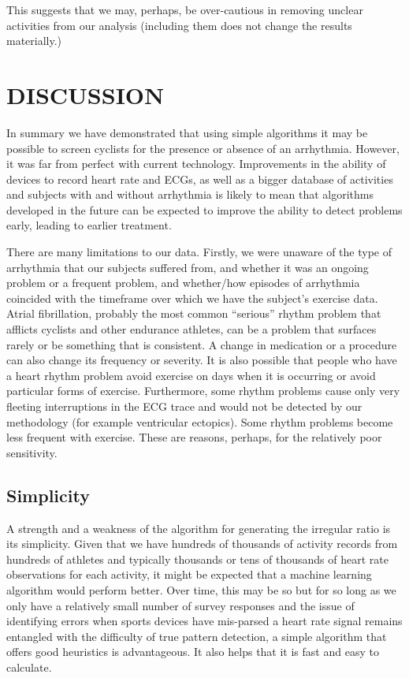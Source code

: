 \documentclass[
  letterpaper,
  DIV=11,
  numbers=noendperiod]{scrartcl}
\begin{document}
This suggests that we may, perhaps, be over-cautious in removing unclear
activities from our analysis (including them does not change the results
materially.)

\section{DISCUSSION}\label{discussion-1}

In summary we have demonstrated that using simple algorithms it may be
possible to screen cyclists for the presence or absence of an
arrhythmia. However, it was far from perfect with current technology.
Improvements in the ability of devices to record heart rate and ECGs, as
well as a bigger database of activities and subjects with and without
arrhythmia is likely to mean that algorithms developed in the future can
be expected to improve the ability to detect problems early, leading to
earlier treatment.

There are many limitations to our data. Firstly, we were unaware of the
type of arrhythmia that our subjects suffered from, and whether it was
an ongoing problem or a frequent problem, and whether/how episodes of
arrhythmia coincided with the timeframe over which we have the subject's
exercise data. Atrial fibrillation, probably the most common ``serious''
rhythm problem that afflicts cyclists and other endurance athletes, can
be a problem that surfaces rarely or be something that is consistent. A
change in medication or a procedure can also change its frequency or
severity. It is also possible that people who have a heart rhythm
problem avoid exercise on days when it is occurring or avoid particular
forms of exercise. Furthermore, some rhythm problems cause only very
fleeting interruptions in the ECG trace and would not be detected by our
methodology (for example ventricular ectopics). Some rhythm problems
become less frequent with exercise. These are reasons, perhaps, for the
relatively poor sensitivity.

\subsection{Simplicity}\label{simplicity}

A strength and a weakness of the algorithm for generating the irregular
ratio is its simplicity. Given that we have hundreds of thousands of
activity records from hundreds of athletes and typically thousands or
tens of thousands of heart rate observations for each activity, it might
be expected that a machine learning algorithm would perform better. Over
time, this may be so but for so long as we only have a relatively small
number of survey responses and the issue of identifying errors when
sports devices have mis-parsed a heart rate signal remains entangled
with the difficulty of true pattern detection, a simple algorithm that
offers good heuristics is advantageous. It also helps that it is fast
and easy to calculate.
\end{document}
